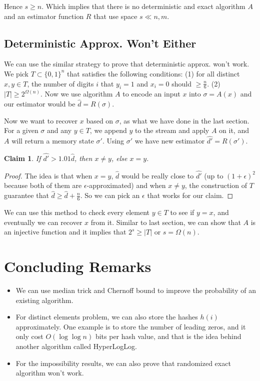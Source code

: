 \documentclass[11pt]{article}
\newtheorem{claim}[theorem]{Claim}
\begin{document}
Hence $s \ge n$. Which implies that there is no deterministic and exact algorithm $A$ and an estimator function $R$ that use space $s \ll n, m$.

\subsection{Deterministic Approx. Won't Either}

We can use the similar strategy to prove that deterministic approx. won't work. We pick $T \subset \{0, 1\}^{n}$ that satisfies the following conditions: (1) for all distinct $x, y \in T$, the number of digits $i$ that $y_i=1$ and $x_i=0$ should $\ge \frac{n}{6}$. (2) $|T| \ge 2^{\Omega(n)}$. Now we use algorithm $A$ to encode an input $x$ into $\sigma=A(x)$ and our estimator would be $\hat{d}=R(\sigma)$.

Now we want to recover $x$ based on $\sigma$, as what we have done in the last section. For a given $\sigma$ and any $y \in T$, we append $y$ to the stream and apply $A$ on it, and $A$ will return a memory state $\sigma'$. Using $\sigma'$ we have new estimator $\hat{d'}=R(\sigma')$.

\begin{claim}
If $\hat{d'} > 1.01 \hat{d}$, then $x \ne y$, else $x=y$.
\end{claim}

\begin{proof}
The idea is that when $x=y$, $\hat{d}$ would be really close to $\hat{d'}$ (up to $(1+\epsilon)^{2}$ because both of them are $\epsilon$-approximated) and when $x \ne y$, the construction of $T$ guarantee that $\hat{d} \ge \hat{d} + \frac{n}{6}$. So we can pick an $\epsilon$ that works for our claim.
\end{proof}

We can use this method to check every element $y \in T$ to see if $y=x$, and eventually we can recover $x$ from it. Similar to last section, we can show that $A$ is an injective function and it implies that $2^{s} \ge |T|$ or $s = \Omega(n)$.

\section{Concluding Remarks}

\begin{itemize}

\item We can use median trick and Chernoff bound to improve the probability of an existing algorithm.

\item For distinct elements problem, we can also store the hashes $h(i)$ approximately. One example is to store the number of leading zeros, and it only cost $O(\log \log n)$ bits per hash value, and that is the idea behind another algorithm called HyperLogLog.

\item For the impossibility results, we can also prove that randomized exact algorithm won't work.

\end{itemize}
\end{document}
